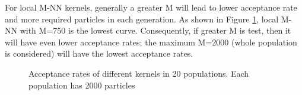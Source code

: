 For local M-NN kernels, generally a greater M will lead to lower acceptance rate and
more required particles in each generation. As shown in Figure \ref{fig:acceptance1}, local M-NN with M=750 is the lowest curve. Consequently, if greater M is test, then it will have even lower acceptance rates; the maximum M=2000 (whole population is considered) will have the lowest acceptance rates.

\begin{figure}
    \begin{center}
    \end{center}

    \caption[Total required samples of different kernels]%
    {Total required samples of different kernels after 20 populations (2000 particles in each population). Different color represents different generations (bottom to top: population 1 to population 20)}
    \label{fig:kernel1}

    \vspace*{\floatsep}

    \begin{center}
    \end{center}

    \caption[Acceptance rates of different kernels]%
    {Acceptance rates of different kernels in 20 populations. Each population has 2000 particles}
    \label{fig:acceptance1}

\end{figure}

